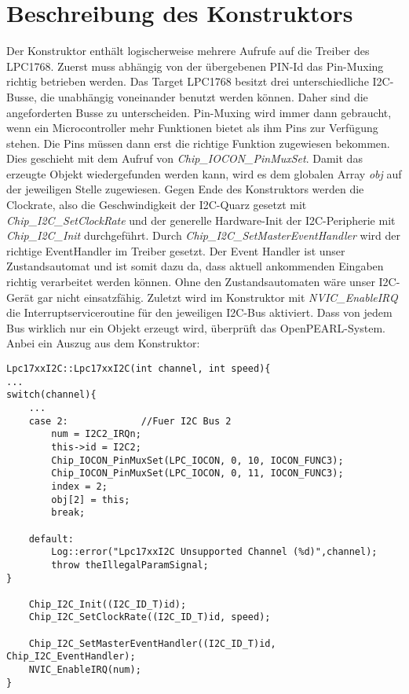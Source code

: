 \section{Beschreibung des Konstruktors}
Der Konstruktor enthält logischerweise mehrere Aufrufe auf die Treiber des LPC1768. Zuerst muss abhängig von der übergebenen PIN-Id das Pin-Muxing richtig betrieben werden. Das Target LPC1768 besitzt drei unterschiedliche I2C-Busse, die unabhängig voneinander benutzt werden können. Daher sind die angeforderten Busse zu unterscheiden. Pin-Muxing wird immer dann gebraucht, wenn ein Microcontroller mehr Funktionen bietet als ihm Pins zur Verfügung stehen. Die Pins müssen dann erst die richtige Funktion zugewiesen bekommen. Dies geschieht mit dem Aufruf von {\textit{Chip\_IOCON\_PinMuxSet}}. Damit das erzeugte Objekt wiedergefunden werden kann, wird es dem globalen Array {\textit{obj}} auf der jeweiligen Stelle zugewiesen. Gegen Ende des Konstruktors werden die Clockrate, also die Geschwindigkeit der I2C-Quarz gesetzt mit {\textit{Chip\_I2C\_SetClockRate}} und der generelle Hardware-Init der I2C-Peripherie mit {\textit{Chip\_I2C\_Init}} durchgeführt. Durch {\textit{Chip\_I2C\_SetMasterEventHandler}} wird der richtige EventHandler im Treiber gesetzt. Der Event Handler ist unser Zustandsautomat und ist somit dazu da, dass aktuell ankommenden Eingaben richtig verarbeitet werden können. Ohne den Zustandsautomaten wäre unser I2C-Gerät gar nicht einsatzfähig. Zuletzt wird im Konstruktor mit {\textit{NVIC\_EnableIRQ}} die Interruptserviceroutine für den jeweiligen I2C-Bus aktiviert. Dass von jedem Bus wirklich nur ein Objekt erzeugt wird, überprüft das OpenPEARL-System. Anbei ein Auszug aus dem Konstruktor:
\begin{lstlisting}
Lpc17xxI2C::Lpc17xxI2C(int channel, int speed){
...
switch(channel){
	...
	case 2:				//Fuer I2C Bus 2
		num = I2C2_IRQn;
		this->id = I2C2;
		Chip_IOCON_PinMuxSet(LPC_IOCON, 0, 10, IOCON_FUNC3);
		Chip_IOCON_PinMuxSet(LPC_IOCON, 0, 11, IOCON_FUNC3);
		index = 2;
		obj[2] = this;
		break;

	default:
		Log::error("Lpc17xxI2C Unsupported Channel (%d)",channel);
		throw theIllegalParamSignal;
}

	Chip_I2C_Init((I2C_ID_T)id);
	Chip_I2C_SetClockRate((I2C_ID_T)id, speed);

	Chip_I2C_SetMasterEventHandler((I2C_ID_T)id, Chip_I2C_EventHandler);
	NVIC_EnableIRQ(num);
}
\end{lstlisting}

